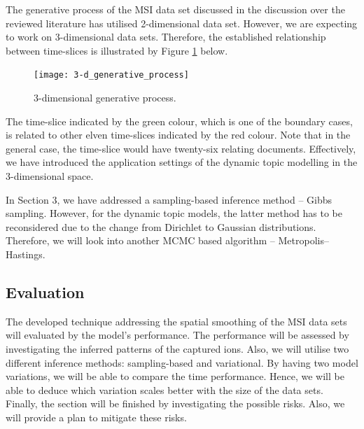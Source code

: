 \documentclass{mprop}
\begin{document}
\par The generative process of the MSI data set discussed in the discussion over the reviewed literature has utilised 2-dimensional data set. However, we are expecting to work on 3-dimensional data sets. Therefore, the established relationship between time-slices is illustrated by Figure \ref{fig:3-d_generative_process} below.
\begin{figure}[H]
  \centering
  \texttt{[image: 3-d\_generative\_process]}
  \caption{3-dimensional generative process.}
  \label{fig:3-d_generative_process}
\end{figure}
The time-slice indicated by the green colour, which is one of the boundary cases, is related to other elven time-slices indicated by the red colour. Note that in the general case, the time-slice would have twenty-six relating documents. Effectively, we have introduced the application settings of the dynamic topic modelling in the 3-dimensional space.  

\par In Section 3, we have addressed a sampling-based inference method -- Gibbs sampling. However, for the dynamic topic models, the latter method has to be reconsidered due to the change from Dirichlet to Gaussian distributions. Therefore, we will look into another MCMC based algorithm -- Metropolis--Hastings.


\subsection{Evaluation}

\par The developed technique addressing the spatial smoothing of the MSI data sets will evaluated by the model's performance. The performance will be assessed by investigating the inferred patterns of the captured ions. Also, we will utilise two different inference methods: sampling-based and variational. By having two model variations, we will be able to compare the time performance. Hence, we will be able to deduce which variation scales better with the size of the data sets. Finally, the section will be finished by investigating the possible risks. Also, we will provide a plan to mitigate these risks.  
\end{document}

